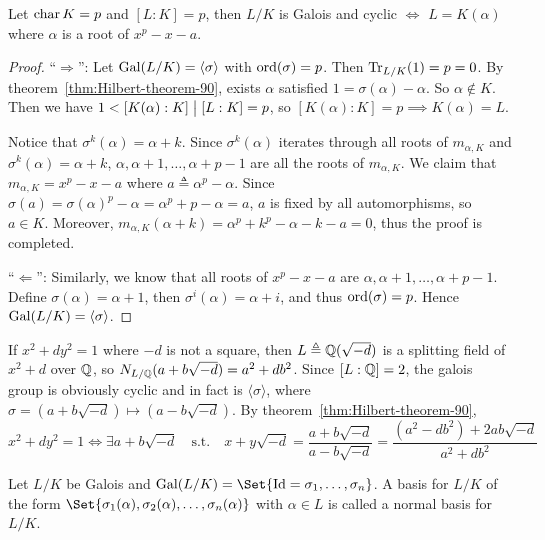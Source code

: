 \begin{coro}
  Let $\operatorname{char} K = p$ and $[L: K] = p$, then $L/K$ is Galois and cyclic $\iff$ $L = K(\alpha)$ where
  $\alpha$ is a root of $x^p - x - a$.

  \begin{proof}
    ``$\Rightarrow$'': Let $\operatorname{Gal}(L/K) = \langle \sigma \rangle$ with $\operatorname{ord}(\sigma) = p$. Then
    $\operatorname{Tr}_{L/K}(1) = p = 0$. By theorem~\ref{thm:Hilbert-theorem-90},
    exists $\alpha$ satisfied $1 = \sigma(\alpha) - \alpha$.
    So $\alpha \not\in K$. Then we have $1 < [K(\alpha): K] \bigm| [L: K] = p$,
    so $[K(\alpha): K] = p \implies K(\alpha) = L$.

    Notice that $\sigma^k(\alpha) = \alpha + k$.
    Since $\sigma^k(\alpha)$ iterates through all roots of $m_{\alpha, K}$ and $\sigma^k(\alpha) = \alpha + k$,
    $\alpha, \alpha+1, \dots, \alpha +p-1$ are all the roots of $m_{\alpha, K}$.
    We claim that $m_{\alpha, K} = x^p - x - a$ where $a \triangleq \alpha^p - \alpha$.
    Since $\sigma(a) = \sigma(\alpha)^p - \alpha = \alpha^p + p - \alpha = a$,
    $a$ is fixed by all automorphisms, so $a \in K$. Moreover, $m_{\alpha, K}(\alpha+k)
    = \alpha^p + k^p - \alpha - k - a = 0$, thus the proof is completed.

    ``$\Leftarrow$'': Similarly, we know that all roots of $x^p - x - a$
    are $\alpha, \alpha+1, \dots, \alpha+{p-1}$. Define $\sigma(\alpha) = \alpha+1$,
    then $\sigma^i(\alpha) = \alpha+i$, and thus $\operatorname{ord}(\sigma) = p$. Hence $\operatorname{Gal}(L/K) = \langle \sigma \rangle$.
  \end{proof}
\end{coro}

\begin{coro}
  If $x^2 + d y^2 = 1$ where $-d$ is not a square, then $L \triangleq \mathbb{Q}(\sqrt{-d})$
  is a splitting field of $x^2 + d$ over $\mathbb{Q}$,
  so $N_{L/\mathbb{Q}}(a + b \sqrt{-d}) = a^2 + d b^2$. Since $[L: \mathbb{Q}] = 2$,
  the galois group is obviously cyclic and in fact is $\langle \sigma \rangle$,
  where $\sigma = (a + b \sqrt{-d}) \mapsto (a - b \sqrt{-d})$.
  By theorem~\ref{thm:Hilbert-theorem-90},
  \[ x^2 + d y^2 = 1 \iff \exists a + b \sqrt{-d} \quad\text{s.t.}\quad x + y \sqrt{-d} = \frac{a+b\sqrt{-d}}{a-b\sqrt{-d}}
    = \frac{(a^2 - db^2) + 2ab\sqrt{-d}}{a^2 + db^2} \]
\end{coro}

\begin{definition}
  Let $L/K$ be Galois and $\Gal(L/K) = \Set{ \text{Id} = \sigma_1, \dots, \sigma_n }$.
  A basis for $L/K$ of the form $\Set{ \sigma_1(\alpha), \sigma_2(\alpha), \dots, \sigma_n(\alpha)}$
  with $\alpha \in L$ is called  a normal basis for $L/K$.
\end{definition}

